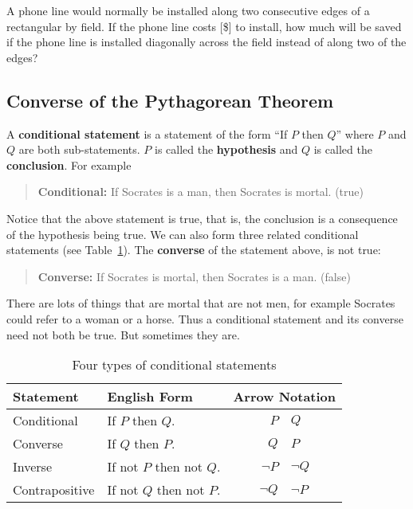 \newpage

\begin{exercise}
  A phone line would normally be installed along two consecutive edges
  of a rectangular  by  field. If the phone
  line costs [\$]{\per\mile} to install, how much will be
  saved if the phone line is installed diagonally across the field
  instead of along two of the edges?

  \vspace{3ex}
  \noindent

\end{exercise}

\subsection{Converse of the Pythagorean Theorem}%
\label{sub:converse-pythagorean-thm}

A \textbf{conditional statement} is a statement of the form ``If \(P\)
then \(Q\)'' where \(P\) and \(Q\) are both sub-statements. \(P\) is
called the \textbf{hypothesis} and \(Q\) is called the
\textbf{conclusion}. For example
\begin{quotation}
  \textbf{Conditional:} If Socrates is a man, then Socrates is mortal.
  (true)
\end{quotation}
Notice that the above statement is true, that is, the conclusion is a
consequence of the hypothesis being true. We can also form three
related conditional statements (see
Table~\ref{tab:conditional-statements}). The \textbf{converse} of the
statement above, is not true:
\begin{quotation}
  \textbf{Converse:} If Socrates is mortal, then Socrates is a man.
  (false)
\end{quotation}
There are lots of things that are mortal that are not men, for example
Socrates could refer to a woman or a horse. Thus a conditional
statement and its converse need not both be true. But sometimes they
are.

\newpage

\begin{table}[h]
  \centering
  \begin{tabular}{llr@{$\:\Rightarrow\:$}l}
    \toprule
    Statement
    & English Form & \multicolumn{2}{c}{Arrow Notation} \\
    \midrule
    Conditional
    & If \(P\) then \(Q\). & \(P\) &\(Q\) \\
    Converse
    & If \(Q\) then \(P\). & \(Q\) &\(P\) \\
    Inverse
    & If not \(P\) then not \(Q\). & \(\neg P\) &\(\neg Q\) \\
    Contrapositive
    & If not \(Q\) then not \(P\). & \(\neg Q\) &\(\neg P\)\\
    \bottomrule
  \end{tabular}
  \caption{Four types of conditional statements}%
  \label{tab:conditional-statements}
\end{table}

